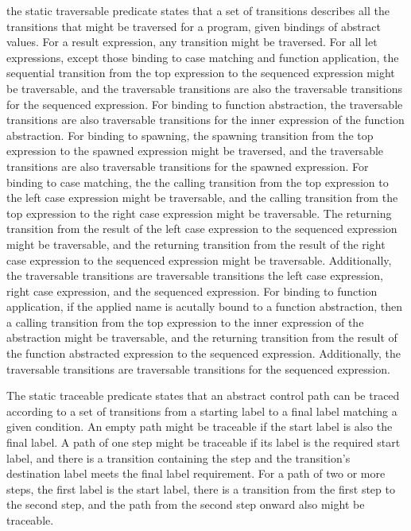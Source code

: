 \documentclass{article}
\begin{document}
the static traversable predicate states that a set of transitions describes all the transitions that might be traversed for a program, given bindings of abstract values.  For a result expression, any transition might be traversed.  For all let expressions, except those binding to case matching and function application, the sequential transition from the top expression to the sequenced expression might be traversable, and the traversable transitions are also the traversable transitions for the sequenced expression.  For binding to function abstraction, the traversable transitions are also traversable transitions for the inner expression of the function abstraction.  For binding to spawning, the spawning transition from the top expression to the spawned expression might be traversed, and the traversable transitions are also traversable transitions for the spawned expression.
For binding to case matching, the the calling transition from the top expression to the left case expression might be traversable, and the calling transition from the top expression to the right case expression might be traversable.  The returning transition from the result of the left case expression to the sequenced expression might be traversable, and the returning transition from the result of the right case expression to the sequenced expression might be traversable.  Additionally, the traversable transitions are traversable transitions the left case expression, right case expression, and the sequenced expression.   
For binding to function application, if the applied name is acutally bound to a function abstraction, then a calling transition from the top expression to the inner expression of the abstraction might be traversable, and the returning transition from the result of the function abstracted expression to the sequenced expression.  Additionally, the traversable transitions are traversable transitions for the sequenced expression. 

The static traceable predicate states that an abstract control path can be traced according to a set of transitions from a starting label to a final label matching a given condition.  An empty path might be traceable if the start label is also the final label.  A path of one step might be traceable if its label is the required start label, and there is a transition containing the step and the transition's destination label meets the final label requirement.   
For a path of two or more steps, the first label is the start label, there is a transition from the first step to the second step, and the path from the second step onward also might be traceable.
\end{document}
